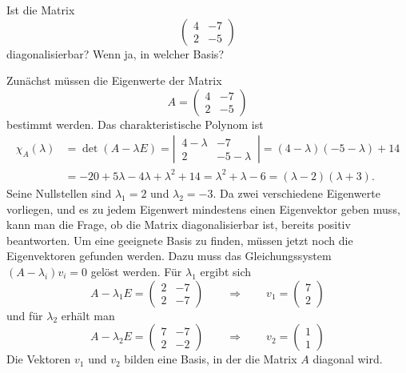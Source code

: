 Ist die Matrix
\[
\begin{pmatrix}
4&-7\\
2&-5
\end{pmatrix}
\]
diagonalisierbar? Wenn ja, in welcher Basis?


\begin{loesung}
Zunächst müssen die Eigenwerte der Matrix
\[
A=
\begin{pmatrix}
4&-7\\
2&-5
\end{pmatrix}
\]
bestimmt werden. Das
charakteristische Polynom ist
\begin{align*}
\chi_A(\lambda)&=
\det(A-\lambda E)
=
\left|\,\begin{matrix}4-\lambda&-7\\2&-5-\lambda\end{matrix}\,\right|
=(4-\lambda)(-5-\lambda)+14\\
&=-20+5\lambda-4\lambda+\lambda^2+14
=\lambda^2+\lambda-6=(\lambda -2)(\lambda +3).
\end{align*}
Seine Nullstellen sind $\lambda_1=2$ und $\lambda_2=-3$. Da zwei
verschiedene Eigenwerte vorliegen, und es zu jedem Eigenwert
mindestens einen Eigenvektor geben muss, kann man die Frage, ob
die Matrix diagonalisierbar ist, bereits positiv beantworten. Um
eine geeignete Basis zu finden, müssen jetzt noch die Eigenvektoren
gefunden werden. Dazu muss das Gleichungssystem $(A-\lambda_i)v_i=0$
gelöst werden. Für $\lambda_1$ ergibt sich
\[
A-\lambda_1 E=\begin{pmatrix}
2&-7\\
2&-7
\end{pmatrix}
\qquad \Rightarrow\qquad v_1=\begin{pmatrix}7\\2\end{pmatrix}
\]
und für $\lambda_2$ erhält man
\[
A-\lambda_2 E=\begin{pmatrix}
7&-7\\
2&-2
\end{pmatrix}
\qquad \Rightarrow\qquad v_2=\begin{pmatrix}1\\1\end{pmatrix}
\]
Die Vektoren $v_1$ und $v_2$ bilden eine Basis, in der die Matrix $A$
diagonal wird.
\end{loesung}


